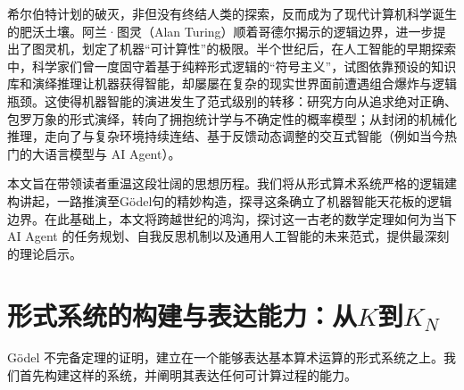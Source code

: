\documentclass[a4paper,12pt]{ctexart}
\begin{document}
希尔伯特计划的破灭，非但没有终结人类的探索，反而成为了现代计算机科学诞生的肥沃土壤。阿兰·图灵（Alan Turing）顺着哥德尔揭示的逻辑边界，进一步提出了图灵机，划定了机器“可计算性”的极限。半个世纪后，在人工智能的早期探索中，科学家们曾一度固守着基于纯粹形式逻辑的“符号主义”，试图依靠预设的知识库和演绎推理让机器获得智能，却屡屡在复杂的现实世界面前遭遇组合爆炸与逻辑瓶颈。这使得机器智能的演进发生了范式级别的转移：研究方向从追求绝对正确、包罗万象的形式演绎，转向了拥抱统计学与不确定性的概率模型；从封闭的机械化推理，走向了与复杂环境持续连结、基于反馈动态调整的交互式智能（例如当今热门的大语言模型与 AI Agent）。

本文旨在带领读者重温这段壮阔的思想历程。我们将从形式算术系统严格的逻辑建构讲起，一路推演至Gödel句的精妙构造，探寻这条确立了机器智能天花板的逻辑边界。在此基础上，本文将跨越世纪的鸿沟，探讨这一古老的数学定理如何为当下 AI Agent 的任务规划、自我反思机制以及通用人工智能的未来范式，提供最深刻的理论启示。

\section{形式系统的构建与表达能力：从$K$到$K_N$}
Gödel 不完备定理的证明，建立在一个能够表达基本算术运算的形式系统之上。我们首先构建这样的系统，并阐明其表达任何可计算过程的能力。
\end{document}
